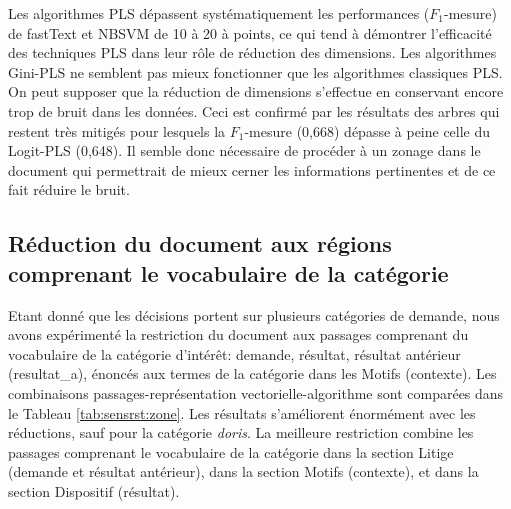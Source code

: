  Les algorithmes PLS dépassent systématiquement les performances ($F_1$-mesure) de fastText et
NBSVM de 10 à 20 à points, ce qui tend à démontrer l'efficacité des techniques PLS dans leur
rôle de réduction des dimensions. Les algorithmes Gini-PLS ne semblent pas mieux
fonctionner que les algorithmes classiques PLS. On peut supposer que la réduction de
dimensions s'effectue en conservant encore trop de bruit dans les données. Ceci est confirmé
par les résultats des arbres qui restent très mitigés pour lesquels la $F_1$-mesure (0,668) dépasse à
peine celle du Logit-PLS (0,648). Il semble donc nécessaire de procéder à un zonage dans le
document qui permettrait de mieux cerner les informations pertinentes et de ce fait réduire le
bruit.

\subsection{Réduction du document aux régions comprenant le vocabulaire de la catégorie}
Etant donné que les décisions portent sur plusieurs catégories de demande, nous avons expérimenté la restriction du document aux passages comprenant du vocabulaire de la catégorie d'intérêt: demande, résultat, résultat antérieur (resultat\_a), énoncés aux termes de la catégorie dans les Motifs (contexte). Les combinaisons passages-représentation vectorielle-algorithme sont comparées dans le Tableau \ref{tab:sensrst:zone}. Les résultats s'améliorent énormément avec les réductions, sauf pour la catégorie \textit{doris}. La meilleure restriction combine les passages comprenant le vocabulaire de la catégorie dans la section Litige (demande et résultat antérieur), dans la section Motifs (contexte), et dans la section Dispositif (résultat).
